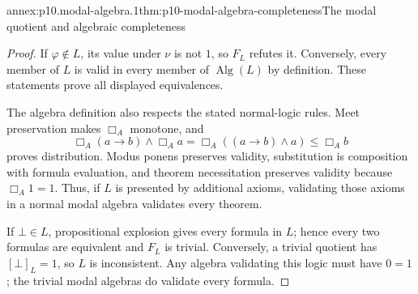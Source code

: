 \begin{annexitem}{annex:p10.modal-algebra.1}{thm:p10-modal-algebra-completeness}{The modal quotient and algebraic completeness}
\begin{proof}
If \(\varphi\notin L\), its value under \(\nu\) is not \(1\),
so \(F_L\) refutes it.  Conversely, every member of \(L\)
is valid in every member of \(\operatorname{Alg}(L)\) by
definition.  These statements prove all displayed equivalences.

The algebra definition also respects the stated normal-logic rules.
Meet preservation makes \(\Box_A\) monotone, and
\[
 \Box_A(a\to b)\wedge\Box_Aa
       =\Box_A((a\to b)\wedge a)\leq\Box_Ab
\]
proves distribution.
Modus ponens preserves validity, substitution is composition
with formula evaluation, and theorem necessitation preserves
validity because \(\Box_A1=1\).
Thus, if \(L\) is presented by additional axioms, validating
those axioms in a normal modal algebra validates every theorem.

If \(\bot\in L\), propositional explosion gives every formula
in \(L\); hence every two formulas are equivalent and \(F_L\)
is trivial.  Conversely, a trivial quotient has
\([\bot]_L=1\), so \(L\) is inconsistent.
Any algebra validating this logic must have \(0=1\);
the trivial modal algebras do validate every formula.
\end{proof}
\end{annexitem}

